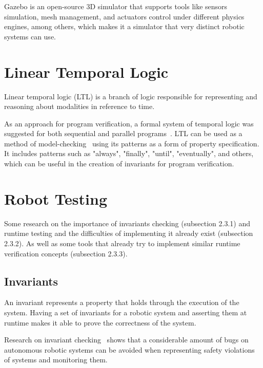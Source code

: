 Gazebo is an open-source 3D simulator that supports tools like sensors simulation, mesh management, and actuators control under different physics engines, among others, which makes it a simulator that very distinct robotic systems can use.

\section{Linear Temporal Logic}
\label{sec:ltl}

Linear temporal logic (LTL) is a branch of logic responsible for representing and reasoning about modalities in reference to time. 

As an approach for program verification, a formal system of temporal logic was suggested for both sequential and parallel programs~\cite{pnueli1977temporal}. LTL can be used as a method of model-checking~\cite{dwyer1998property} using its patterns as a form of property specification. It includes patterns such as "always", "finally", "until", "eventually", and others, which can be useful in the creation of invariants for program verification.

\section{Robot Testing}
\label{sec:robottesting}

Some research on the importance of invariants checking (subsection 2.3.1) and runtime testing and the difficulties of implementing it already exist (subsection 2.3.2). As well as some tools that already try to implement similar runtime verification concepts (subsection 2.3.3).

\subsection{Invariants}

An invariant represents a property that holds through the execution of the system. Having a set of invariants for a robotic system and asserting them at runtime makes it able to prove the correctness of the system.

Research on invariant checking~\cite{zizyte2021importance} shows that a considerable amount of bugs on autonomous robotic systems can be avoided when representing safety violations of systems and monitoring them.


